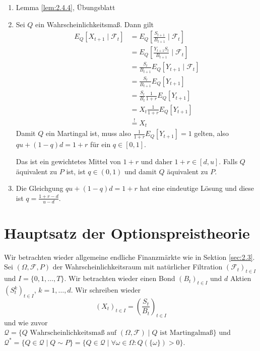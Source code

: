 \documentclass[a4paper,twoside,DIV15,BCOR12mm]{scrbook}
\newcommand{\cF}{\mathcal F}
\newcommand{\cQ}{\mathcal Q}
\begin{document}
\begin{beweis}
\begin{enumerate}
\item Lemma \ref{lem:2.4.4}, Übungsblatt
\item Sei $Q$ ein Wahrscheinlichkeitsmaß. Dann gilt
\begin{align*}
E_Q[X_{t+1}\mid \cF_t]
&= E_Q[\frac{S_{t+1}}{B_{t+1}} \mid\cF_t] \\
&= E_Q[\frac{Y_{t+1}S_t}{B_{t+1}} \mid \cF_t] \\
&= \frac{S_t}{B_{t+1}} E_Q[Y_{t+1} \mid \cF_t] \\
&= \frac{S_t}{B_{t+1}} E_Q[Y_{t+1}] \\
&= \frac{S_t}{B_t} \frac{1}{1+r} E_Q[Y_{t+1}] \\
&= X_t \frac{1}{1+r} E_Q[Y_{t+1}] \\
&\stackrel ! = X_t 
\end{align*}
Damit $Q$ ein Martingal ist, muss also $\frac{1}{1+r} E_Q[Y_{t+1}] = 1$ gelten, also $qu + (1-q)d = 1+r$ für ein $q\in[0, 1]$.

Das ist ein gewichtetes Mittel von $1+r$ und daher $1+r\in [d,u]$. Falls $Q$ äquivalent zu $P$ ist, ist $q\in(0, 1)$ und damit $Q$ äquivalent zu $P$.
\item Die Gleichgung $qu + (1-q)d = 1+r$  hat eine eindeutige Lösung und diese ist $q=\frac{1+r-d}{u-d}$.
\end{enumerate}
\end{beweis}

\section{Hauptsatz der Optionspreistheorie}

Wir betrachten wieder allgemeine endliche Finanzmärkte wie in Sektion \ref{sec:2.3}. Sei $(\Omega, \cF, P)$ der Wahrscheinlichkeitsraum mit natürlicher Filtration $(\cF_t)_{t\in I}$ und $I=\{0, 1,\ldots, T\}$. Wir betrachten wieder einen Bond $(B_t)_{t\in I}$ und $d$ Aktien $(S_t^k)_{t\in I}$, $k=1,\ldots,d$. Wir schreiben wieder
\[
(X_t)_{t\in I} =\left( \frac{S_t}{B_t}\right)_{t\in I}
\]
und wie zuvor $\cQ= \{Q \text{ Wahrscheinlichkeitsmaß auf } (\Omega,\cF)\mid Q \text{ ist Martingalmaß}\}$ und $\cQ^* = \{Q\in \cQ\mid Q \sim P\} = \{Q\in \cQ \mid \forall \omega\in \Omega: Q(\{\omega\}) > 0\}$.
\end{document}
